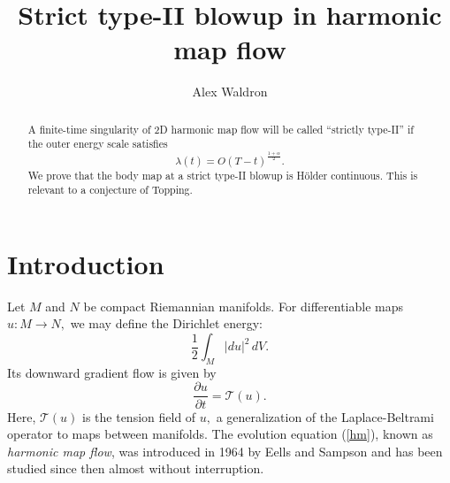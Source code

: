 \documentclass[12pt]{amsart}
\newcommand{\T}{{\mathcal T}}
\newcommand{\pd}{{\partial}}
\theoremstyle{others}
\numberwithin{equation}{section}
\begin{document}
\title[Harmonic map flow with strict type-II blowup]{Strict type-II blowup in harmonic map flow}
\author{Alex Waldron}
\address{University of Wisconsin, Madison}


\begin{abstract} A finite-time singularity of 2D harmonic map flow will be called ``strictly type-II'' if the outer energy scale satisfies
$$\lambda(t) = O (T-t)^{\frac{1 + \alpha}{2} }.$$
We prove that the body map at a strict type-II blowup is H\"older continuous. This is relevant to a conjecture of Topping. %
\end{abstract}

\maketitle



\thispagestyle{empty}







\section{Introduction}

Let $M$ and $N$ be compact Riemannian manifolds. For differentiable maps $u: M \to N,$ we may define the Dirichlet energy:
$$\frac12 \int_M |d u|^2 \, dV.$$
Its downward gradient flow is given by
\begin{equation}\label{hm}
\frac{\pd u}{\pd t} = \mathcal{T}(u).
\end{equation}
Here, $\T(u)$ is the tension field of $u,$ a generalization of the Laplace-Beltrami operator to maps between manifolds.
The evolution equation (\ref{hm}), known as \emph{harmonic map flow}, was introduced in 1964 by Eells and Sampson \cite{eellssampson} and has been studied since then almost without interruption.
\end{document}
